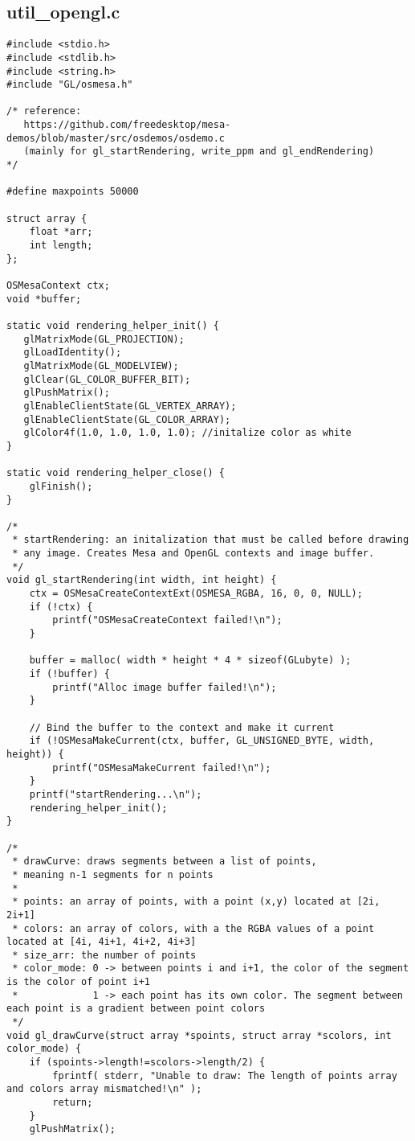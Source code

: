 \documentclass[main.tex]{subfiles}
\begin{document}
\subsection{util_opengl.c}
\begin{lstlisting}
#include <stdio.h>
#include <stdlib.h>
#include <string.h>
#include "GL/osmesa.h"

/* reference: 
   https://github.com/freedesktop/mesa-demos/blob/master/src/osdemos/osdemo.c
   (mainly for gl_startRendering, write_ppm and gl_endRendering)
*/

#define maxpoints 50000

struct array {
    float *arr;
    int length;
};

OSMesaContext ctx;
void *buffer;

static void rendering_helper_init() {
   glMatrixMode(GL_PROJECTION);
   glLoadIdentity();
   glMatrixMode(GL_MODELVIEW);
   glClear(GL_COLOR_BUFFER_BIT);
   glPushMatrix();
   glEnableClientState(GL_VERTEX_ARRAY);
   glEnableClientState(GL_COLOR_ARRAY);
   glColor4f(1.0, 1.0, 1.0, 1.0); //initalize color as white
}

static void rendering_helper_close() {
    glFinish();
}

/*
 * startRendering: an initalization that must be called before drawing
 * any image. Creates Mesa and OpenGL contexts and image buffer.
 */
void gl_startRendering(int width, int height) {
    ctx = OSMesaCreateContextExt(OSMESA_RGBA, 16, 0, 0, NULL);
    if (!ctx) {
        printf("OSMesaCreateContext failed!\n");
    }

    buffer = malloc( width * height * 4 * sizeof(GLubyte) );
    if (!buffer) {
        printf("Alloc image buffer failed!\n");
    }

    // Bind the buffer to the context and make it current
    if (!OSMesaMakeCurrent(ctx, buffer, GL_UNSIGNED_BYTE, width, height)) {
        printf("OSMesaMakeCurrent failed!\n");
    }
    printf("startRendering...\n");
    rendering_helper_init();
}

/*
 * drawCurve: draws segments between a list of points,
 * meaning n-1 segments for n points
 *
 * points: an array of points, with a point (x,y) located at [2i, 2i+1]
 * colors: an array of colors, with a the RGBA values of a point located at [4i, 4i+1, 4i+2, 4i+3]
 * size_arr: the number of points
 * color_mode: 0 -> between points i and i+1, the color of the segment is the color of point i+1
 *             1 -> each point has its own color. The segment between each point is a gradient between point colors
 */
void gl_drawCurve(struct array *spoints, struct array *scolors, int color_mode) {
    if (spoints->length!=scolors->length/2) {
        fprintf( stderr, "Unable to draw: The length of points array and colors array mismatched!\n" );
        return;
    }
    glPushMatrix();
    

\end{lstlisting}
\end{document}
